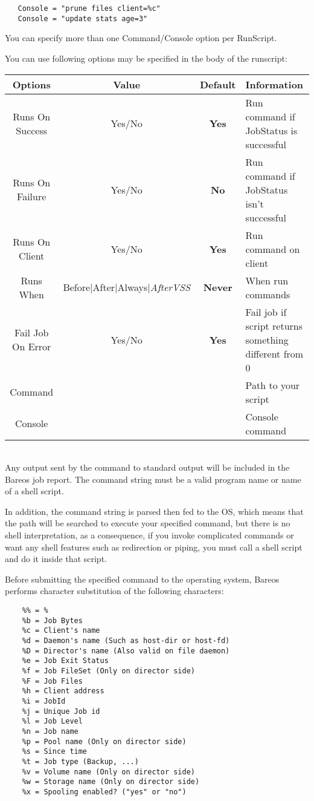 \begin{description}
\begin{verbatim}
   Console = "prune files client=%c"
   Console = "update stats age=3"
\end{verbatim}

You can specify more than one Command/Console option per RunScript.

You can use following options may be specified in the body
of the runscript:\\

\begin{tabular}{|c|c|c|l}
\hline
Options         & Value  & Default & Information   \\
\hline
\hline
Runs On Success & Yes/No & {\bf Yes} & Run command if JobStatus is successful\\
\hline
Runs On Failure & Yes/No & {\bf No} & Run command if JobStatus isn't successful\\
\hline
Runs On Client  & Yes/No & {\bf Yes} & Run command on client\\
\hline
Runs When       & Before|After|Always|\textsl{AfterVSS} & {\bf Never} & When run commands\\
\hline
Fail Job On Error & Yes/No & {\bf Yes} & Fail job if script returns
                                          something different from 0 \\
\hline
Command          &       &          & Path to your script\\
\hline
Console          &       &          & Console command\\
\hline
\end{tabular}
   \\

Any output sent by the command to standard output will be included in the
Bareos job report.  The command string must be a valid program name or name
of a shell script.

In addition, the command string is parsed then fed to the OS,
which means that the path will be searched to execute your specified
command, but there is no shell interpretation, as a consequence, if you
invoke complicated commands or want any shell features such as redirection
or piping, you must call a shell script and do it inside that script.

Before submitting the specified command to the operating system, Bareos
performs character substitution of the following characters:

\label{character substitution}
\footnotesize
\begin{verbatim}
    %% = %
    %b = Job Bytes
    %c = Client's name
    %d = Daemon's name (Such as host-dir or host-fd)
    %D = Director's name (Also valid on file daemon)
    %e = Job Exit Status
    %f = Job FileSet (Only on director side)
    %F = Job Files
    %h = Client address
    %i = JobId
    %j = Unique Job id
    %l = Job Level
    %n = Job name
    %p = Pool name (Only on director side)
    %s = Since time
    %t = Job type (Backup, ...)
    %v = Volume name (Only on director side)
    %w = Storage name (Only on director side)
    %x = Spooling enabled? ("yes" or "no")
\end{verbatim}
\normalsize


\end{description}
